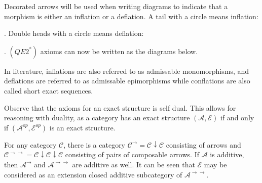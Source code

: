     \begin{remark}
        Decorated arrows will be used when writing diagrams to indicate that a morphism is either an inflation or a deflation. A tail with a circle means inflation: . Double heads with a circle means deflation: . $(QE2^*)$ axioms can now be written as the diagrams below.
        \begin{center}
        \end{center}
    \end{remark}

    \begin{remark}
        In literature, inflations are also referred to as admissable monomorphisms, and deflations are referred to as admissable epimorphisms while conflations are also called short exact sequences.
    \end{remark}

    \begin{remark}
        Observe that the axioms for an exact structure is self dual. This allows for reasoning with duality, as a category has an exact structure $(\mathcal{A},\mathcal{E})$ if and only if $(\mathcal{A}^{op},\mathcal{E}^{op})$ is an exact structure.
    \end{remark}

    \begin{remark}
        For any category $\mathcal{C}$, there is a category $\mathcal{C}^{\rightarrow}=\mathcal{C}\downarrow\mathcal{C}$ consisting of arrows and $\mathcal{C}^{\rightarrow\rightarrow}=\mathcal{C}\downarrow\mathcal{C}\downarrow\mathcal{C}$ consisting of pairs of composable arrows. If $\mathcal{A}$ is additive, then $\mathcal{A}^{\rightarrow}$ and $\mathcal{A}^{\rightarrow\rightarrow}$ are additive as well. It can be seen that $\mathcal{E}$ may be considered as an extension closed additive subcategory of $\mathcal{A}^{\rightarrow\rightarrow}$.
    \end{remark}

